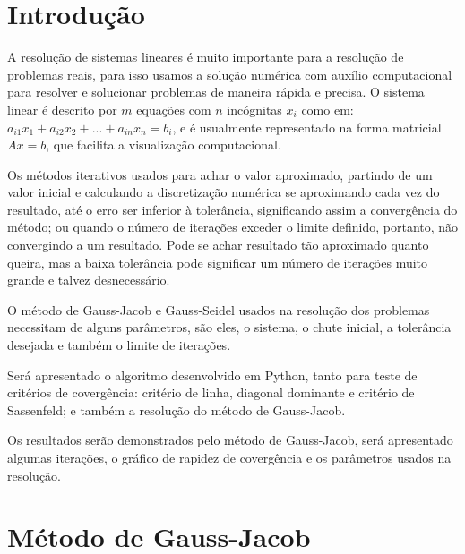 \documentclass[
12pt,				%
openright,			%
twoside,			%
a4paper,			%
english,			%
french,				%
spanish,			%
brazil				%
]{abntex2_new}
\begin{document}
		\tableofcontents*
		
		
		\textual
		
		
		\chapter*[Introdução]{Introdução}
		A resolução de sistemas lineares é muito importante para a resolução de
		problemas
		reais, para isso usamos a solução numérica com auxílio computacional para
		resolver
		e solucionar problemas de maneira rápida e precisa. O sistema linear é descrito
		por 
		$m$ equações com $n$ incógnitas $x_i$ como em: $a_{i1} x_1 + a_{i2} x_2 + ... +
		a_{in} x_n = b_i$, 
		e é usualmente representado na forma matricial $Ax = b$, que facilita a
		visualização
		computacional.
		
		Os métodos iterativos usados para achar o valor aproximado, partindo de um valor
		inicial
		e calculando a discretização numérica se aproximando cada vez do resultado, até
		o erro ser inferior à
		tolerância, significando assim a convergência do método; ou quando o número de iterações
		exceder o limite definido, portanto, não convergindo a um resultado. Pode se achar
		 resultado
		tão aproximado quanto
		queira, mas a baixa tolerância pode significar um número de iterações muito
		grande e talvez desnecessário.
		
		O método de Gauss-Jacob e Gauss-Seidel usados na resolução dos problemas necessitam de alguns
		parâmetros, são eles, 
		o sistema, o chute inicial, a tolerância desejada e também o
		limite de iterações.
		
		Será apresentado o algoritmo desenvolvido em Python, tanto para teste de
		critérios de covergência: 
		critério de linha, diagonal dominante e critério de Sassenfeld; e também a
		resolução do método de 
		Gauss-Jacob.
		
		Os resultados serão demonstrados pelo método de Gauss-Jacob, será apresentado
		algumas iterações,
		o gráfico de rapidez de covergência e os parâmetros usados na resolução.
		
		\chapter{Método de Gauss-Jacob}
		
\end{document}

